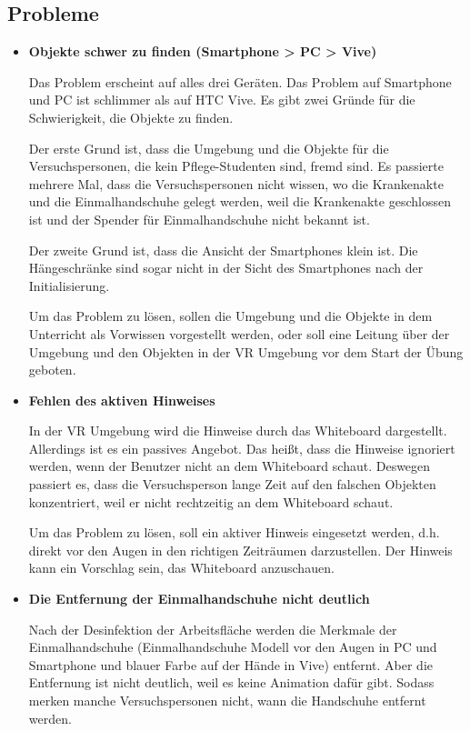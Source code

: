 \subsection{Probleme}
\begin{itemize}
    \item \textbf{Objekte schwer zu finden (Smartphone > PC > Vive)}
    
    Das Problem erscheint auf alles drei Geräten. Das Problem auf Smartphone und PC ist schlimmer als auf HTC Vive. Es gibt zwei Gründe für die Schwierigkeit, die Objekte zu finden.
    
    Der erste Grund ist, dass die Umgebung und die Objekte für die Versuchspersonen, die kein Pflege-Studenten sind, fremd sind. Es passierte mehrere Mal, dass die Versuchspersonen nicht wissen, wo die Krankenakte und die Einmalhandschuhe gelegt werden, weil die Krankenakte geschlossen ist und der Spender für Einmalhandschuhe nicht bekannt ist.
    
    Der zweite Grund ist, dass die Ansicht der Smartphones klein ist. Die Hängeschränke sind sogar nicht in der Sicht des Smartphones nach der Initialisierung.
    
    Um das Problem zu lösen, sollen die Umgebung und die Objekte in dem Unterricht als Vorwissen vorgestellt werden, oder soll eine Leitung über der Umgebung und den Objekten in der VR Umgebung vor dem Start der Übung geboten.
  
    \item \textbf{Fehlen des aktiven Hinweises}
    
    In der VR Umgebung wird die Hinweise durch das Whiteboard dargestellt. Allerdings ist es ein passives Angebot. Das heißt, dass die Hinweise ignoriert werden, wenn der Benutzer nicht an dem Whiteboard schaut. Deswegen passiert es, dass die Versuchsperson lange Zeit auf den falschen Objekten konzentriert, weil er nicht rechtzeitig an dem Whiteboard schaut.
    
    Um das Problem zu lösen, soll ein aktiver Hinweis eingesetzt werden, d.h. direkt vor den Augen in den richtigen Zeiträumen darzustellen. Der Hinweis kann ein Vorschlag sein, das Whiteboard anzuschauen.
    
    \item \textbf{Die Entfernung der Einmalhandschuhe nicht deutlich}
    
    Nach der Desinfektion der Arbeitsfläche werden die Merkmale der Einmalhandschuhe (Einmalhandschuhe Modell vor den Augen in PC und Smartphone und blauer Farbe auf der Hände in Vive) entfernt. Aber die Entfernung ist nicht deutlich, weil es keine Animation dafür gibt. Sodass merken manche Versuchspersonen nicht, wann die Handschuhe entfernt werden.
    

\end{itemize}
